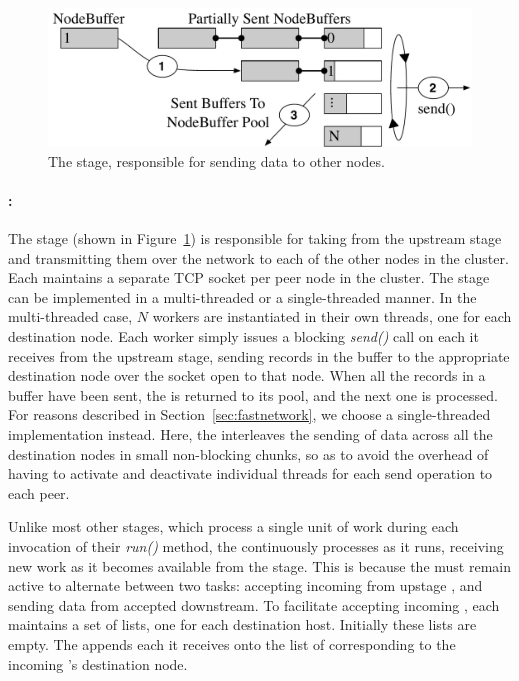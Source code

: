\begin{figure}
  \centering
  \includegraphics[width=\columnwidth]{tritonsort/figs/sender_stage.pdf}
  \caption{The \sender stage, responsible for sending data to
    other nodes.}
  \label{fig:sender}
\end{figure}

\paragraph{\sender:}  The \sender stage (shown in Figure~\ref{fig:sender}) is
responsible for taking \nodebuffers from the upstream \pnts stage and
transmitting them over the network to each of the other nodes in the cluster.
Each \sender maintains a separate TCP socket per peer node in the cluster.  The
\sender stage can be implemented in a multi-threaded or a single-threaded
manner.  In the multi-threaded case, $N$ \sender workers are instantiated in
their own threads, one for each destination node.  Each \sender worker simply
issues a blocking \textit{send()} call on each \nodebuffer it receives from the
upstream \pnts stage, sending records in the buffer to the appropriate
destination node over the socket open to that node.  When all the records in a
buffer have been sent, the \nodebuffer is returned to its pool, and the next
one is processed.  For reasons described in Section~\ref{sec:fastnetwork}, we
choose a single-threaded \sender implementation instead.  Here, the \sender
interleaves the sending of data across all the destination nodes in small
non-blocking chunks, so as to avoid the overhead of having to activate and
deactivate individual threads for each send operation to each peer.

Unlike most other stages, which process a single unit of work during each
invocation of their \textit{run()} method, the \sender continuously processes
\nodebuffers as it runs, receiving new work as it becomes available from the
\pnts stage.  This is because the \sender must remain active to alternate
between two tasks: accepting incoming \nodebuffers from upstage \pntss, and
sending data from accepted \nodebuffers downstream.  To facilitate accepting
incoming \nodebuffers, each \sender maintains a set of \nodebuffer lists, one
for each destination host.  Initially these lists are empty.  The \sender
appends each \nodebuffer it receives onto the list of \nodebuffers
corresponding to the incoming \nodebuffer's destination node.

